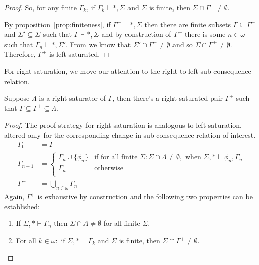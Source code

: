 \documentclass[10pt]{article}
\begin{document}
\begin{lemma}
\begin{proof}
    So, for any finite \(\Gamma_{k}\), if \(\Gamma_{k} \vdash \ast, \Sigma\) and \(\Sigma\) is finite, then \(\Sigma \cap \Gamma^{+} \ne \emptyset\).

    By proposition~\ref{prop:finiteness}, if \(\Gamma^{+} \vdash \ast, \Sigma\) then there are finite subsets \(\Gamma \subseteq \Gamma^{+}\) and \(\Sigma' \subseteq \Sigma\) such that \(\Gamma \vdash \ast, \Sigma\) and by construction of \(\Gamma^{+}\) there is some \(n \in \omega\) such that \(\Gamma_{n} \vdash \ast, \Sigma'\).
    From \label{leftLindenbaum:2} we know that \(\Sigma' \cap \Gamma^{+} \ne \emptyset\) and so \(\Sigma \cap \Gamma^{+} \ne \emptyset\).
    Therefore, \(\Gamma^{+}\) is left-saturated.
  \end{proof}

\end{lemma}

For right saturation, we move our attention to the right-to-left sub-consequence relation.

\begin{lemma}\label{lindenbaum:right}
  Suppose \(\Lambda\) is a right saturator of \(\Gamma\), then there's a right-saturated pair \(\Gamma^{+}\) such that \(\Gamma \subseteq \Gamma^{+} \subseteq \Lambda\).
  \begin{proof}
    The proof strategy for right-saturation is analogous to left-saturation, altered only for the corresponding change in sub-consequence relation of interest.
    \begin{align*}
      \Gamma_{0} &= \Gamma \\
      \Gamma_{n+1} &=
                                                  \begin{cases}
                                                    \Gamma_{n} \cup \{\phi_{n}\} &\text{if for all finite } \Sigma \colon \Sigma \cap \Lambda \ne \emptyset, \text{ when } \Sigma,\ast \vdash \phi_{n},\Gamma_{n} \\
                                                    \Gamma_{n} &\text{otherwise} \\
                                                  \end{cases}
      \\
      \Gamma^{+} &= \bigcup_{n \in \omega}\Gamma_{n}
    \end{align*}
    Again, \(\Gamma^{+}\) is exhaustive by construction and the following two properties can be established:
    \begin{enumerate}[label=(\arabic*)]
    \item\label{rightLindenbaum:1} If \(\Sigma,\ast \vdash \Gamma_{n}\) then \(\Sigma \cap \Lambda \ne \emptyset\) for all finite \(\Sigma\).
    \item\label{rightLindenbaum:2} For all \(k \in \omega \colon\) if \(\Sigma, \ast \vdash \Gamma_{k}\) and \(\Sigma\) is finite, then \(\Sigma \cap \Gamma^{+} \ne \emptyset\).
    \end{enumerate}
  \end{proof}
\end{lemma}
\end{document}

